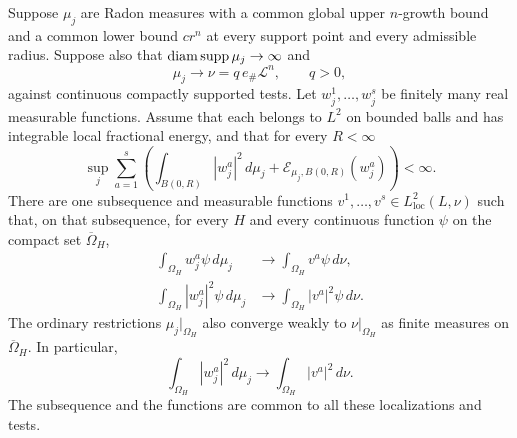 \begin{lemma}
\label{lem:moving-compactness}
Suppose $\mu_j$ are Radon measures with a common global upper $n$-growth
bound and a common lower bound $cr^n$ at every support point and every
admissible radius.  Suppose also that
$\operatorname{diam}\operatorname{supp}\mu_j\to\infty$ and
\begin{equation}
 \mu_j\longrightarrow\nu=q\,e_\#\mathcal L^n,
       \qquad q>0,
 \label{eq:height-flat-measure-limit}
\end{equation}
against continuous compactly supported tests.  Let
$w_j^1,\ldots,w_j^s$ be finitely many real measurable functions.  Assume
that each belongs to $L^2$ on bounded balls and has integrable local
fractional energy, and that for every $R<\infty$
\begin{equation}
 \sup_j\sum_{a=1}^s
 \left(\int_{B(0,R)}|w_j^a|^2\,d\mu_j
        +\mathcal E_{\mu_j,B(0,R)}(w_j^a)\right)<\infty.
 \label{eq:height-compactness-hypothesis}
\end{equation}
There are one subsequence and measurable functions
$v^1,\ldots,v^s\in L^2_{\mathrm{loc}}(L,\nu)$ such that, on that
subsequence, for every $H$ and every continuous function $\psi$ on the
compact set $\overline\Omega_H$,
\begin{align}
 \int_{\Omega_H}w_j^a\psi\,d\mu_j
       &\longrightarrow\int_{\Omega_H}v^a\psi\,d\nu,
 \label{eq:height-signed-moment-limit}\\
 \int_{\Omega_H}|w_j^a|^2\psi\,d\mu_j
       &\longrightarrow\int_{\Omega_H}|v^a|^2\psi\,d\nu.
 \label{eq:height-square-moment-limit}
\end{align}
The ordinary restrictions $\mu_j|_{\Omega_H}$ also converge weakly to
$\nu|_{\Omega_H}$ as finite measures on $\overline\Omega_H$.
In particular,
\begin{equation}
 \int_{\Omega_H}|w_j^a|^2\,d\mu_j
       \longrightarrow\int_{\Omega_H}|v^a|^2\,d\nu.
 \label{eq:height-norm-limit}
\end{equation}
The subsequence and the functions are common to all these localizations
and tests.
\end{lemma}

